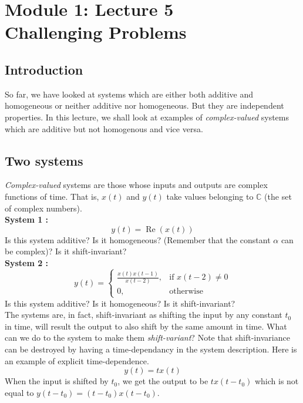 \section{Module 1: Lecture 5\\ Challenging Problems}


\subsection{Introduction}
So far, we have looked at systems which are either both additive and homogeneous or neither additive nor homogeneous. But they are independent properties. In this lecture, we shall look at examples of \textit{complex-valued} systems which are additive but not homogenous and vice versa. 

\subsection{Two systems}
\textit{Complex-valued} systems are those whose inputs and outputs are complex functions of time. That is, $x(t)$ and $y(t)$ take values belonging to $\mathbb{C}$ (the set of complex numbers). 
\\

\textbf{System 1 :}
\begin{equation}
y(t) = \operatorname{Re}(x(t)) \nonumber
\end{equation} 
Is this system additive? Is it homogeneous? (Remember that the constant $\alpha$ can be complex)? Is it shift-invariant? 
\\

\textbf{System 2 :}
\[
    y(t)= 
\begin{cases}
    \frac{x(t)x(t-1)}{x(t-2)},& \text{if } x(t-2) \neq 0\\
    0,              & \text{otherwise}
\end{cases}
\]
Is this system additive? Is it homogeneous? Is it shift-invariant? 
\\

The systems are, in fact, shift-invariant as shifting the input by any constant $t_{0}$ in time, will result the output to also shift by the same amount in time. What can we do to the system to make them \textit{shift-variant}? Note that shift-invariance can be destroyed by having a time-dependancy in the system description. Here is an example of explicit time-dependence. 
\begin{equation}
y(t) = tx(t) \nonumber
\end{equation} When the input is shifted by $t_{0}$, we get the output to be $tx(t-t_{0})$ which is not equal to $y(t-t_{0}) = (t-t_{0})x(t - t_{0})$. 
\\


